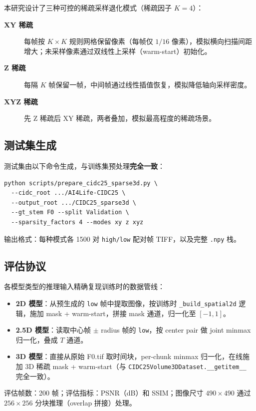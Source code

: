 \documentclass[UTF8, scheme=plain, 11pt, a4paper]{ctexart}
\begin{document}
本研究设计了三种可控的稀疏采样退化模式（稀疏因子 $K=4$）：

\begin{description}
  \item[\textbf{XY 稀疏}] 每帧按 $K\times K$ 规则网格保留像素（每帧仅 $1/16$ 像素），模拟横向扫描间距增大；未采样像素通过双线性上采样（warm-start）初始化。
  \item[\textbf{Z 稀疏}] 每隔 $K$ 帧保留一帧，中间帧通过线性插值恢复，模拟降低轴向采样密度。
  \item[\textbf{XYZ 稀疏}] 先 Z 稀疏后 XY 稀疏，两者叠加，模拟最高程度的稀疏场景。
\end{description}

\subsection{测试集生成}

测试集由以下命令生成，与训练集预处理\textbf{完全一致}：
\begin{verbatim}
python scripts/prepare_cidc25_sparse3d.py \
  --cidc_root .../AI4Life-CIDC25 \
  --output_root .../CIDC25_sparse3d \
  --gt_stem F0 --split Validation \
  --sparsity_factors 4 --modes xy z xyz
\end{verbatim}

\noindent 输出格式：每种模式各 1500 对 \texttt{high/low} 配对帧 TIFF，以及完整 \texttt{.npy} 栈。

\subsection{评估协议}

各模型类型的推理输入精确复现训练时的数据管线：

\begin{itemize}
  \item \textbf{2D 模型}：从预生成的 \texttt{low} 帧中提取图像，按训练时 \texttt{\_build\_spatial2d} 逻辑，施加 mask + warm-start，拼接 mask 通道，归一化至 $[-1,1]$。
  \item \textbf{2.5D 模型}：读取中心帧 $\pm$ radius 帧的 \texttt{low}，按 center pair 做 joint minmax 归一化，叠成 $T$ 通道。
  \item \textbf{3D 模型}：直接从原始 F0.tif 取时间块，per-chunk minmax 归一化，在线施加 3D 稀疏 mask + warm-start（与 \texttt{CIDC25Volume3DDataset.\_\_getitem\_\_} 完全一致）。
\end{itemize}

\noindent 评估帧数：200 帧；评估指标：PSNR（dB）和 SSIM；图像尺寸 $490\times490$ 通过 $256\times256$ 分块推理（overlap 拼接）处理。
\end{document}
